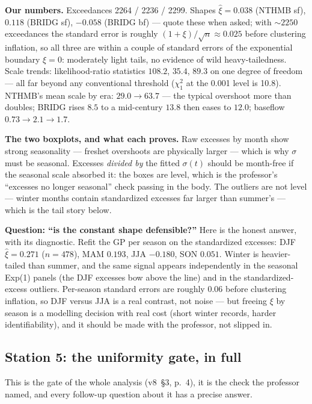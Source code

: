 \documentclass[11pt]{article}
\begin{document}
\textbf{Our numbers.} Exceedances 2264 / 2236 / 2299. Shapes
$\hat\xi = 0.038$ (NTHMB sf), $0.118$ (BRIDG sf), $-0.058$ (BRIDG bf) ---
quote these when asked; with $\sim 2250$ exceedances the standard error is
roughly $(1+\xi)/\sqrt{n} \approx 0.025$ before clustering inflation, so all
three are within a couple of standard errors of the exponential boundary
$\xi = 0$: moderately light tails, no evidence of wild heavy-tailedness.
Scale trends: likelihood-ratio statistics $108.2$, $35.4$, $89.3$ on one
degree of freedom --- all far beyond any conventional threshold ($\chi^2_1$
at the 0.001 level is 10.8). NTHMB's mean scale by era: $29.0 \to 63.7$ ---
the typical overshoot more than doubles; BRIDG rises $8.5$ to a
mid-century $13.8$ then eases to $12.0$; baseflow $0.73 \to 2.1 \to 1.7$.

\textbf{The two boxplots, and what each proves.} Raw excesses by month show
strong seasonality --- freshet overshoots are physically larger --- which is
why $\sigma$ must be seasonal. Excesses \emph{divided by} the fitted
$\sigma(t)$ should be month-free if the seasonal scale absorbed it: the boxes
are level, which is the professor's ``excesses no longer seasonal'' check
passing in the body. The outliers are not level --- winter months contain
standardized excesses far larger than summer's --- which is the tail story
below.

\textbf{Question: ``is the constant shape defensible?''} Here is the honest
answer, with its diagnostic. Refit the GP per season on the standardized
excesses: DJF $\hat\xi = 0.271$ ($n = 478$), MAM $0.193$, JJA $-0.180$, SON
$0.051$. Winter is heavier-tailed than summer, and the same signal appears
independently in the seasonal Exp(1) panels (the DJF excesses bow above the
line) and in the standardized-excess outliers. Per-season standard errors are
roughly $0.06$ before clustering inflation, so DJF versus JJA is a real
contrast, not noise --- but freeing $\xi$ by season is a modelling decision
with real cost (short winter records, harder identifiability), and it should
be made with the professor, not slipped in.

\subsection{Station 5: the uniformity gate, in full}
\label{sec:pit}

This is the gate of the whole analysis (v8~\S3, p.~4), it is the check the
professor named, and every follow-up question about it has a precise answer.
\end{document}
